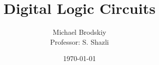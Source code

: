 


\pagestyle{fancy}

\title{Digital Logic Circuits}
\date{\today}
\author{Michael Brodskiy\\ \small Professor: S. Shazli}



\maketitle

\thispagestyle{fancy}

\newpage

